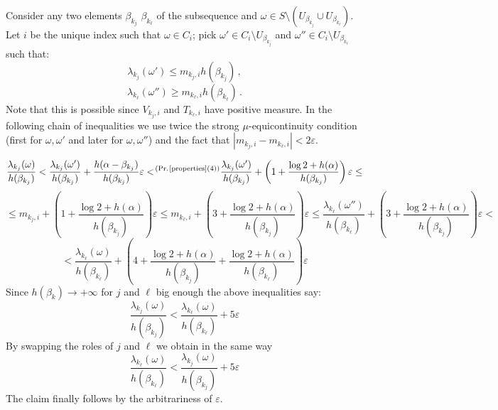 \documentclass[10 pt,a4paper]{article}
\theoremstyle{plain}
\theoremstyle{definition}
\theoremstyle{named}
\begin{document}
 Consider any two elements $\beta_{k_j}$ $\beta_{k_{\ell}}$ of the subsequence and  $\omega\in S\setminus( U_{\beta_{k_j}}\cup U_{\beta_{k_\ell}})$. Let $i$ be the unique index such that $\omega\in C_i$; pick $\omega'\in C_i
\setminus U_{\beta_{k_j}}$  and  $\omega''\in C_i
\setminus U_{\beta_{k_\ell}}$ such that:
\[
\lambda_{k_j}(\omega')\le m_{k_j,i} h(\beta_{k_j})\,,
\]
\[
\lambda_{k_\ell}(\omega'')\ge m_{k_\ell,i} h(\beta_{k_\ell})\,.
\]
Note that this is possible since $V_{k_j,i}$ and $T_{k_\ell,i}$ have positive measure.  In the following chain of inequalities we use twice  the strong $\mu$-equicontinuity condition (first for $\omega,\omega'$ and later for $\omega,\omega''$) and the fact that $|m_{k_j,i}-m_{k_\ell,i}|<2\varepsilon$.

\[
\frac{\lambda_{k_j}(\omega)}{h(\beta_{k_j})}< \frac{\lambda_{k_j}(\omega')}{h(\beta_{k_j})}+ \frac{h(\alpha-\beta_{k_j})}{h(\beta_{k_j})}\varepsilon<\!^{(\text{Pr. \!\!\ref{properties}(4)})}\frac{\lambda_{k_j}(\omega')}{h(\beta_{k_j})}+\left(1+\frac{\log 2+h(\alpha)}{h(\beta_{k_j})}\right)\varepsilon \le 
\]
\[
\le m_{k_j,i}+\left(1+\frac{\log 2+h(\alpha)}{h(\beta_{k_j})}\right)\varepsilon\le m_{k_\ell,i}+\left(3+\frac{\log 2+h(\alpha)}{h(\beta_{k_j})}\right)\varepsilon\le \frac{\lambda_{k_\ell}(\omega'')}{h(\beta_{k_\ell})}+\left(3+\frac{\log 2+h(\alpha)}{h(\beta_{k_j})}\right)\varepsilon< 
\]
\[
<\frac{\lambda_{k_\ell}(\omega)}{h(\beta_{k_\ell})}+\left(4+\frac{\log 2+h(\alpha)}{h(\beta_{k_j})}+\frac{\log 2+h(\alpha)}{h(\beta_{k_\ell})}\right)\varepsilon
\]
Since $h(\beta_k)\to +\infty$  for $j$ and $\ell$ big enough the above inequalities say:
\[
\frac{\lambda_{k_j}(\omega)}{h(\beta_{k_j})}< \frac{\lambda_{k_\ell}(\omega)}{h(\beta_{k_\ell})}+5\varepsilon
\]
By swapping the roles of $j$ and $\ell$ we obtain in the same way
\[
\frac{\lambda_{k_\ell}(\omega)}{h(\beta_{k_\ell})}< \frac{\lambda_{k_j}(\omega)}{h(\beta_{k_j})}+5\varepsilon
\]
 The claim finally follows by the arbitrariness of $\varepsilon$.
\endproof
\end{document}
